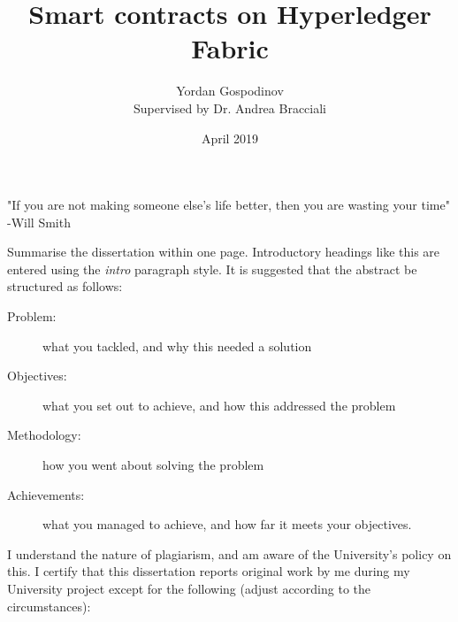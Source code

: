 \documentclass[a4paper,11pt]{report}
\title{Smart contracts on Hyperledger Fabric}
\author{
{Yordan Gospodinov} \\
{\small{Supervised by Dr. Andrea Bracciali}}
}
\date{April 2019}
\begin{document}
\maketitle				




\begin{center}
\Huge "If you are not making someone else's life better, then you are wasting your time" -Will Smith
\end{center}

\clearpage    



Summarise the dissertation within one page. Introductory headings like this are
entered using the {\it intro} paragraph style. It is suggested that the abstract
be structured as follows:

\begin{description}

  \item[Problem:]
  what you tackled, and why this needed a solution

  \item[Objectives:]
  what you set out to achieve, and how this addressed the problem

  \item[Methodology:]
  how you went about solving the problem

  \item[Achievements:]
  what you managed to achieve, and how far it meets your objectives.

\end{description}




I understand the nature of plagiarism, and am aware of the University's policy
on this. I certify that this dissertation reports original work by me during my
University project except for the following (adjust according to the
circumstances):
\end{document}
